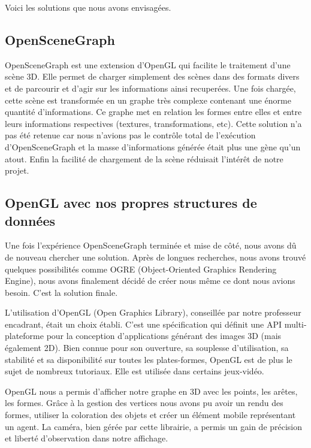 \documentclass[a4paper,12pt]{report}
\begin{document}
Voici les solutions que nous avons envisagées.
 
\subsection{OpenSceneGraph}

OpenSceneGraph est une extension d'OpenGL qui facilite le traitement d'une scène 3D. Elle permet de charger simplement des scènes dans des formats divers et de parcourir et d'agir sur les informations ainsi recuperées.
Une fois chargée, cette scène est transformée en un graphe très complexe contenant une énorme quantité d'informations. Ce graphe met en relation les formes entre elles et entre leurs informations respectives (textures, transformations, etc).
Cette solution n'a pas été retenue car nous n'avions pas le contrôle total de l'exécution d'OpenSceneGraph et la masse d'informations générée était plus une gène qu'un atout. Enfin la facilité de chargement de la scène réduisait l'intérêt de notre projet.

\subsection{OpenGL avec nos propres structures de données}

Une fois l'expérience OpenSceneGraph terminée et mise de côté, nous avons dû de nouveau chercher une solution. Après de longues recherches, nous avons trouvé quelques possibilités comme OGRE (Object-Oriented Graphics Rendering Engine), nous avons finalement décidé de créer nous même ce dont nous avions besoin. C'est la solution finale.

L'utilisation d'OpenGL (Open Graphics Library), conseillée par notre professeur encadrant, était un choix établi. C'est une spécification qui définit une API multi-plateforme pour la conception d'applications générant des images 3D (mais également 2D). Bien connue pour son ouverture, sa souplesse d'utilisation, sa stabilité et sa disponibilité sur toutes les plates-formes, OpenGL est de plus le sujet de nombreux tutoriaux. Elle est utilisée dans certains jeux-vidéo.

OpenGL nous a permis d'afficher notre graphe en 3D avec les points, les arêtes, les formes. Grâce à la gestion des vertices nous avons pu avoir un rendu des formes, utiliser la coloration des objets et créer un élément mobile représentant un agent. La caméra, bien gérée par cette librairie, a permis un gain de précision et liberté d'observation dans notre affichage.
\end{document}
